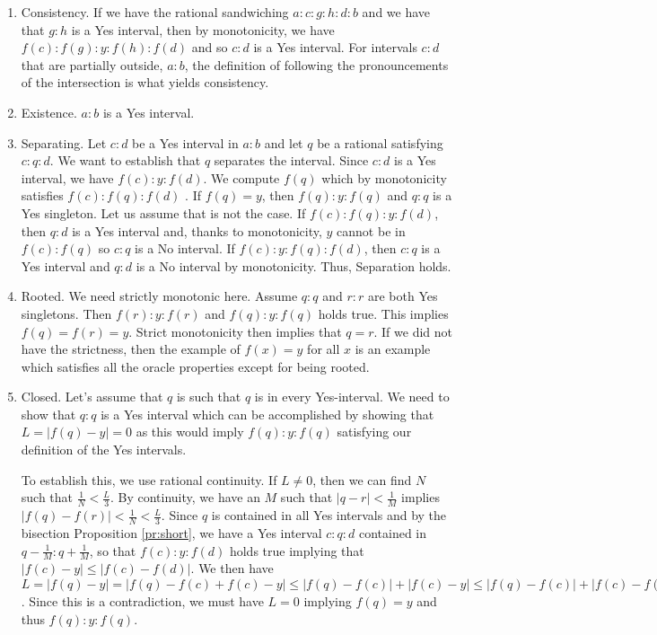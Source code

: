 \documentclass[12pt]{article}
\begin{document}
\begin{enumerate}
    \item Consistency. If we have the rational sandwiching $a:c:g:h:d:b$ and we have that $g:h$ is a Yes interval, then by monotonicity, we have $f(c):f(g):y:f(h):f(d)$ and so $c:d$ is a Yes interval. For intervals $c:d$ that are partially outside, $a:b$, the definition of following the pronouncements of the intersection is what yields consistency.
    \item Existence. $a:b$ is a Yes interval.
    \item Separating. Let $c:d$ be a Yes interval in $a:b$ and let $q$ be a rational satisfying $c:q:d$. We want to establish that $q$ separates the interval. Since $c:d$ is a Yes interval, we have $f(c):y:f(d)$. We compute $f(q)$ which by monotonicity satisfies $f(c):f(q):f(d)$ . If $f(q) = y$, then $f(q):y:f(q)$ and $q:q$ is a Yes singleton. Let us assume that is not the case. If $f(c):f(q):y:f(d)$, then $q:d$ is a Yes interval and, thanks to monotonicity, $y$ cannot be in $f(c):f(q)$ so $c:q$ is a No interval. If $f(c):y:f(q):f(d)$, then $c:q$ is a Yes interval and $q:d$ is a No interval by monotonicity. Thus, Separation holds. 
    \item Rooted. We need strictly monotonic here. Assume $q:q$ and $r:r$ are both Yes singletons. Then $f(r):y:f(r)$ and $f(q):y:f(q)$ holds true. This implies $f(q)=f(r)=y$. Strict monotonicity then implies that $q=r$. If we did not have the strictness, then the example of $f(x)=y$ for all $x$ is an example which satisfies all the oracle properties except for being rooted. 
    \item Closed. Let's assume that $q$ is such that $q$ is in every Yes-interval. We need to show that $q:q$ is a Yes interval which can be accomplished by showing that $L = |f(q) - y| = 0$ as this would imply $f(q):y:f(q)$ satisfying our definition of the Yes intervals. 
    
    To establish this, we use rational continuity. If $L \neq 0$, then we can find $N$ such that $\frac{1}{N} < \frac{L}{3}$. By continuity, we have an $M$ such that $|q-r|<\frac{1}{M}$ implies $|f(q)-f(r)| < \frac{1}{N} < \frac{L}{3}$. Since $q$ is contained in all Yes intervals and by the bisection Proposition \ref{pr:short}, we have a Yes interval $c:q:d$ contained in $q-\frac{1}{M}:q+\frac{1}{M}$, so that $f(c):y:f(d)$ holds true implying that $|f(c) - y| \leq |f(c)-f(d)|$. We then have $L = |f(q)-y| = |f(q) - f(c) + f(c) - y| \leq |f(q)-f(c)| + |f(c)-y| \leq |f(q)-f(c)| + |f(c) - f(d)| \leq |f(q) - f(c) | + |f(c) - f(q)| + |f(q) - f(d)| < \frac{3}{N} < L$. Since this is a contradiction, we must have $L=0$ implying $f(q) = y$ and thus $f(q):y:f(q)$.
\end{enumerate}
\end{document}
